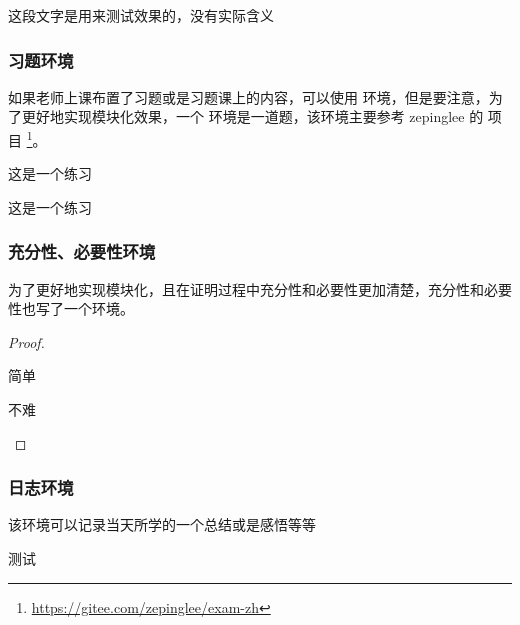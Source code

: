 \documentclass{xdyy-usermanual}
\begin{document}
\begin{vexample}
    \begin{detail}[
      book = {《泛函分析讲义》},  %
      page = {103},               %
      author = {许全华},          %
      edition = {第一版},         %
      year = {2017},              %
      line = {倒数第三行},        %
      original = {                %
        ...
      }
    ]
      这段文字是用来测试效果的，没有实际含义
    \end{detail}
\end{vexample}



\subsubsection{ 习题环境  }

如果老师上课布置了习题或是习题课上的内容，可以使用  环境，但是要注意，为了更好地实现模块化效果，一个  环境是一道题，该环境主要参考 zepinglee 的  项目 \footnote{ \url{https://gitee.com/zepinglee/exam-zh}}。

\begin{vexample}
    \begin{exercise}
      这是一个练习
    \end{exercise}

    \begin{exercise}
      这是一个练习
    \end{exercise}
\end{vexample}




\subsubsection{ 充分性、必要性环境  }

为了更好地实现模块化，且在证明过程中充分性和必要性更加清楚，充分性和必要性也写了一个环境。

\begin{vexample}
    \begin{proof}
      \begin{necessity}
        简单
      \end{necessity}
    
      \begin{sufficiency}
        不难
        \qedhere
      \end{sufficiency}
    \end{proof}
\end{vexample}



\subsubsection{ 日志环境  }

该环境可以记录当天所学的一个总结或是感悟等等

\begin{vexample}
    \begin{timelog}[date = {2022-02-24}]
      测试
    \end{timelog}
\end{vexample}
\end{document}
